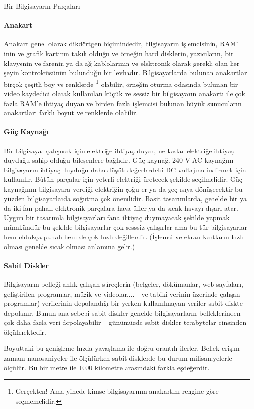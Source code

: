 \documentclass[10pt,a5paper]{book}
\begin{document}
\begin{section}{Bir Bilgisayarın Parçaları}
\paragraph{Anakart}{Anakart genel olarak dikdörtgen biçimindedir, bilgisayarın işlemcisinin, RAM' inin ve grafik kartının takılı olduğu ve örneğin hard disklerin, yazıcıların, bir klavyenin ve farenin ya da ağ kablolarının ve elektronik olarak gerekli olan her şeyin kontrolcüsünün bulunduğu bir levhadır. Bilgisayarlarda bulunan anakartlar birçok çeşitli boy ve renklerde 
\footnote{Gerçekten! Ama yinede kimse bilgisayarının anakartını rengine göre seçmemelidir.}
olabilir, örneğin oturma odasında bulunan bir video kaydedici olarak kullanılan küçük ve sessiz bir bilgisayarın anakartı ile çok fazla RAM'e ihtiyaç duyan ve birden fazla işlemcisi bulunan büyük sunucuların anakartları farklı boyut ve renklerde olabilir.}
\paragraph{Güç Kaynağı}{Bir bilgisayar çalışmak için elektriğe ihtiyaç duyar, ne kadar elektriğe ihtiyaç duyduğu sahip olduğu bileşenlere bağlıdır. Güç kaynağı 240 V AC kaynağını bilgisayarın ihtiyaç duyduğu daha düşük değerlerdeki DC voltajına indirmek için kullanılır. Bütün parçalar için yeterli elektriği üretecek şekilde seçilmelidir. Güç kaynağının bilgisayara verdiği elektriğin çoğu er ya da geç ısıya dönüşecektir bu yüzden bilgisayarlarda soğutma çok önemlidir. Basit tasarımlarda, genelde bir ya da iki fan pahalı elektronik parçalara hava üfler ya da sıcak havayı dışarı atar. Uygun bir tasarımla bilgisayarları fana ihtiyaç duymayacak şekilde yapmak mümkündür bu şekilde bilgisayarlar çok sesssiz çalışırlar ama bu tür bilgisayarlar hem oldukça pahalı hem de çok hızlı değillerdir. (İşlemci ve ekran kartların hızlı olması genelde sıcak olması anlamına gelir.)}
\paragraph{Sabit Diskler}{Bilgisayarın belleği anlık çalışan süreçlerin (belgeler, dökümanlar, web sayfaları, geliştirilen programlar, müzik ve videolar,... - ve tabiki verinin üzerinde çalışan programlar) verilerinin depolandığı bir yerken kullanılmayan veriler sabit diskte depolanır. Bunun ana sebebi sabit diskler genelde bilgisayarların belleklerinden çok daha fazla veri depolayabilir – günümüzde sabit diskler terabytelar cinsinden ölçülmektedir.}

Boyuttaki bu genişleme hızda yavaşlama ile doğru orantılı ilerler. Bellek erişim zamanı nanosaniyeler ile ölçülürken sabit disklerde bu durum milisaniyelerle ölçülür. Bu bir metre ile 1000 kilometre arasındaki farkla eşdeğerdir.


\end{section}
\end{document}

